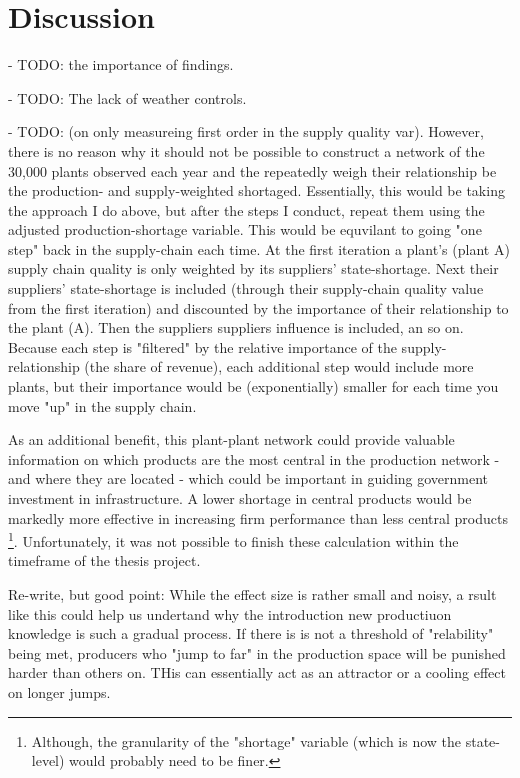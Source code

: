 \documentclass[11pt]{article}
\begin{document}
\section{Discussion}%
\label{sec:discussion}

- TODO: the importance of findings.

- TODO: The lack of weather controls.

- TODO: (on only measureing first order in the supply quality var). However, there is no reason why it should not be possible to construct a network of the ~ 30,000 plants observed each year and the repeatedly weigh their relationship be the production- and supply-weighted shortaged. Essentially, this would be taking the approach I do above, but after the steps I conduct, repeat them using the adjusted production-shortage variable. This would be equvilant to going "one step" back in the supply-chain each time. At the first iteration a plant's (plant A) supply chain quality is only weighted by its suppliers' state-shortage. Next their suppliers' state-shortage is included (through their supply-chain quality value from the first iteration) and discounted by the importance of their relationship to the plant (A). Then the suppliers suppliers influence is included, an so on. Because each step is "filtered" by the relative importance of the supply-relationship (the share of revenue), each additional step would include more plants, but their importance would be (exponentially) smaller for each time you move "up" in the supply chain. 

As an additional benefit, this plant-plant network could provide valuable information on which products are the most central in the production network - and where they are located - which could be important in guiding government investment in infrastructure. A lower shortage in central products would be markedly more effective in increasing firm performance than less central products \footnote{Although, the granularity of the "shortage" variable (which is now the state-level) would probably need to be finer.}. Unfortunately, it was not possible to finish these calculation within the timeframe of the thesis project.

Re-write, but good point:
While the effect size is rather small and noisy, a rsult like this could help us undertand why the introduction new productiuon knowledge is such a gradual process. If there is is not a threshold of "relability" being met, producers who "jump to far" in the production space will be punished harder than others on. THis can essentially act as an attractor or a cooling effect on longer jumps.
\end{document}
